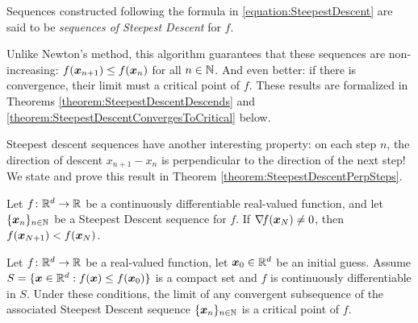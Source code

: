 \begin{remark}
Sequences constructed following the formula in \eqref{equation:SteepestDescent} are said to be \emph{sequences of Steepest Descent} for $f$.

Unlike Newton's method, this algorithm guarantees that these sequences are non-increasing: $f(\boldsymbol{x}_{n+1}) \leq f(\boldsymbol{x}_n)$ for all $n \in \mathbb{N}$.  And even better: if there is convergence, their limit must a critical point of $f$.  These results are formalized in Theorems \ref{theorem:SteepestDescentDescends} and \ref{theorem:SteepestDescentConvergesToCritical}  below.

Steepest descent sequences have another interesting property: on each step $n$, the direction of descent $x_{n+1} - x_n$ is perpendicular to the direction of the next step!  We state and prove this result in Theorem \ref{theorem:SteepestDescentPerpSteps}.
\end{remark}

\begin{theorem}\label{theorem:SteepestDescentDescends}
Let $f\colon \mathbb{R}^d \to \mathbb{R}$ be a continuously differentiable real-valued function, and let $\{ \boldsymbol{x}_n \}_{n\in\mathbb{N}}$ be a Steepest Descent sequence for $f$.  If $\mathop{\nabla\! {f}}(\boldsymbol{x}_N) \neq 0$, then $f(\boldsymbol{x}_{N+1}) < f(\boldsymbol{x}_N)$.
\end{theorem}

\begin{theorem}\label{theorem:SteepestDescentConvergesToCritical}
Let $f\colon \mathbb{R}^d \to \mathbb{R}$ be a real-valued function, let $\boldsymbol{x}_0 \in \mathbb{R}^d$ be an initial guess.  Assume $S = \{ \boldsymbol{x} \in \mathbb{R}^d :  f(\boldsymbol{x}) \leq f(\boldsymbol{x}_0) \}$ is a compact set and $f$ is continuously differentiable in $S$.  Under these conditions, the limit of any convergent subsequence of the associated Steepest Descent sequence $\{ \boldsymbol{x}_n \}_{n\in \mathbb{N}}$ is a critical point of $f$.
\end{theorem}


